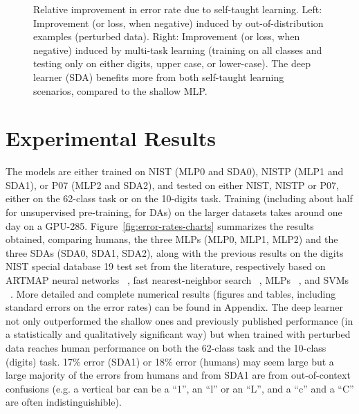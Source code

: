 \documentclass[smallcondensed]{svjour3}     %
\begin{document}
\begin{figure}[ht]
\centerline{}
\caption{Relative improvement in error rate due to self-taught learning. 
Left: Improvement (or loss, when negative)
induced by out-of-distribution examples (perturbed data). 
Right: Improvement (or loss, when negative) induced by multi-task 
learning (training on all classes and testing only on either digits,
upper case, or lower-case). The deep learner (SDA) benefits more from
both self-taught learning scenarios, compared to the shallow MLP.}
\label{fig:improvements-charts}
\end{figure}

\section{Experimental Results}

The models are either trained on NIST (MLP0 and SDA0), 
NISTP (MLP1 and SDA1), or P07 (MLP2 and SDA2), and tested
on either NIST, NISTP or P07, either on the 62-class task
or on the 10-digits task. Training (including about half
for unsupervised pre-training, for DAs) on the larger
datasets takes around one day on a GPU-285.
Figure~\ref{fig:error-rates-charts} summarizes the results obtained,
comparing humans, the three MLPs (MLP0, MLP1, MLP2) and the three SDAs (SDA0, SDA1,
SDA2), along with the previous results on the digits NIST special database
19 test set from the literature, respectively based on ARTMAP neural
networks ~\citep{Granger+al-2007}, fast nearest-neighbor search
~\citep{Cortes+al-2000}, MLPs ~\citep{Oliveira+al-2002-short}, and SVMs
~\citep{Milgram+al-2005}.  More detailed and complete numerical results
(figures and tables, including standard errors on the error rates) can be
found in Appendix.
The deep learner not only outperformed the shallow ones and
previously published performance (in a statistically and qualitatively
significant way) but when trained with perturbed data
reaches human performance on both the 62-class task
and the 10-class (digits) task. 
17\% error (SDA1) or 18\% error (humans) may seem large but a large
majority of the errors from humans and from SDA1 are from out-of-context
confusions (e.g. a vertical bar can be a ``1'', an ``l'' or an ``L'', and a
``c'' and a ``C'' are often indistinguishible).
\end{document}
